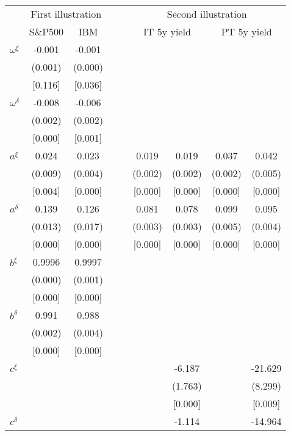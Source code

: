 \documentclass[a4paper,12pt]{article}
\begin{document}
\begin{table}[tb]
{\small
\rule{0mm}{5ex}
\begin{tabular}{l c c c c c c c}
\hline \hline
    & \multicolumn{2}{c}{First illustration}& \ \ & \multicolumn{4}{c}{Second illustration}     \\
    & {S\&P500} & {IBM}      & & \multicolumn{2}{c}{IT 5y yield} & \multicolumn{2}{c}{PT 5y yield}     \\
\hline
$\omega^\xi$	&	-0.001	 &	-0.001	 & & &	& &	\\
	&	(0.001)	&	(0.000)	 & & &	& &	\\
	&	[0.116]	&	[0.036]	 & & &	& &	\\
$\omega^\delta$ & -0.008&-0.006	 & & &	& &	\\
	&	(0.002)	&	(0.002)	 & & &	& &	\\
	&	[0.000]	&	[0.001]	 & & &	& &	\\
$a^\xi$ &	0.024 	&0.023   & & 0.019   & 0.019    &	0.037  & 0.042  \\
	&	(0.009)	&	(0.004)	 & & (0.002) & (0.002)  & (0.002)  & (0.005)  \\
	&	[0.004]	&	[0.000]	 & & [0.000] & [0.000]  &  [0.000] & [0.000]  \\
$a^\delta$& 0.139	&0.126   & & 0.081   & 0.078    &	0.099  & 0.095        \\
	&	(0.013)	&	(0.017)	 & & (0.003) & (0.003)  & (0.005)  & (0.004)	 \\
	&	[0.000]	&	[0.000]	 & & [0.000] & [0.000]  & [0.000]  & [0.000]   \\
$b^\xi$	&0.9996	&	0.9997	 & &         &          &          &   	     \\
	&	(0.000)	&	(0.001)	 & &         &          &          &   	\\
	&	[0.000]	&	[0.000]	 & &         &          &          &   	\\
$b^\delta$&0.991&	0.988    & &         &       	&          &   	\\
	&	(0.002)	&	(0.004)	 & &         &          &          &   	\\
	&	[0.000]	&	[0.000]	 & &         &          &          &   	\\
$c^\xi$	&	  	&	    	 & &         & -6.187   &          & -21.629	 	\\
	&	     	&	     	 & &         & (1.763)  &    	   & (8.299)	\\
	&           &	     	 & &         & [0.000]  &          & [0.009]	  	\\
$c^\delta$	&   &	         & &         & -1.114   &          & -14.964	\\

\end{tabular}}
\end{table}
\end{document}
